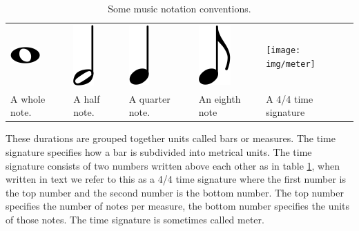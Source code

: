 \begin{table}
\caption{Some music notation conventions.}
\label{tab:notation}
\centering
\begin{tabular}{lllll}
\parbox{0.15\linewidth}{
\centering
\includegraphics[scale=0.5]{img/whole_note}
}
&
\parbox{0.15\linewidth}{
\centering
\includegraphics[scale=0.5]{img/half_note}
}
&
\parbox{0.15\linewidth}{
\centering
\includegraphics[scale=0.5]{img/quarter_note}
}
&
\parbox{0.15\linewidth}{
\centering
\includegraphics[scale=0.5]{img/eighth_note}
}
&
\parbox{0.15\linewidth}{
\centering
\texttt{[image: img/meter]}
}
\\
A whole note. & A half note. & A quarter note. & An eighth note & A 4/4 time signature\\

\end{tabular}
\end{table}

These durations are grouped together units called bars or measures. The time signature specifies how a bar is subdivided into metrical units. The time signature consists of two numbers written above each other as in table \ref{tab:notation}, when written in text we refer to this as a 4/4 time signature where the first number is the top number and the second number is the bottom number. The top number specifies the number of notes per measure, the bottom number specifies the units of those notes. The time signature is sometimes called meter.

